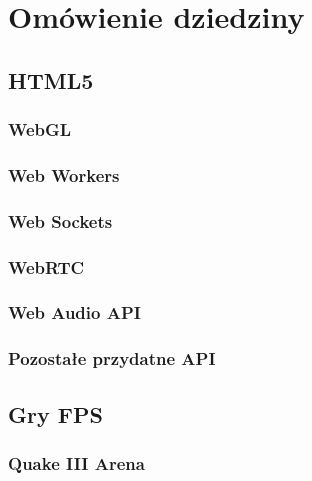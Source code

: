 \chapter{Omówienie dziedziny}
\label{cha:omowienieDziedziny}

\section{HTML5}
\label{sec:html5}

\subsection{WebGL}
\label{ssec:webgl}

\subsection{Web Workers}
\label{ssec:webWorkers}

\subsection{Web Sockets}
\label{ssec:webSockets}

\subsection{WebRTC}
\label{ssec:webrtc}

\subsection{Web Audio API}
\label{ssec:webAudio}

\subsection{Pozostałe przydatne API}
\label{ssec:pozostaleApi}


\section{Gry FPS}
\label{sec:gryFPS}

\subsection{Quake III Arena}
\label{ssec:quake3}

